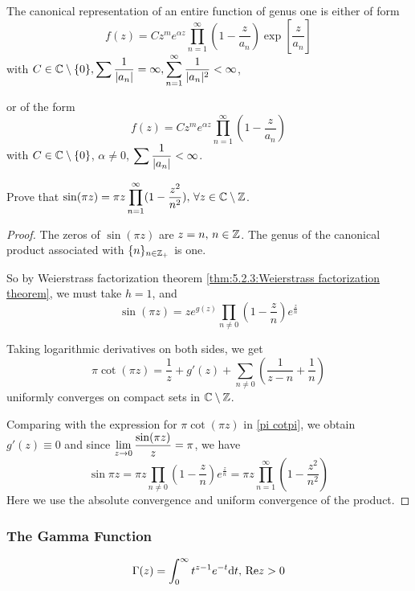 \begin{example}
    The canonical representation of  an entire function of genus one is either of form 
    \begin{equation}
        f(z)=Cz^m e^{\alpha z}\prod_{n=1}^\infty(1-\frac{z}{a_n})\exp\left[\frac{z}{a_n}\right]
    \end{equation}
    with  $ C\in\mathbb C\setminus\{0\},\displaystyle\sum\frac{1}{|a_n|}=\infty,\sum_{n=1}^\infty\frac{1}{|a_n|^2}<\infty $,

    or of the form 
    \begin{equation}
        f(z)=Cz^m e^{\alpha z}\prod_{n=1}^\infty(1-\frac{z}{a_n})
    \end{equation}
    with  $ C\in\mathbb C\setminus\{0\} $, $ \alpha\neq 0 $,  $ \displaystyle\sum\frac{1}{|a_n|}<\infty $.   
\end{example}
\begin{example}
    Prove that  $ \sin(\pi z)=\pi z\displaystyle\prod_{n=1}^\infty(1-\frac{z^2}{n^2}),\,\forall z\in \mathbb C\setminus\mathbb Z $.\label{product expression of sin pi z}
\end{example}
\begin{proof}
    The zeros of  $ \sin(\pi z) $ are  $ z=n,\,n\in \mathbb Z $. The genus of the canonical product associated with  $ \{n\}_{n\in\mathbb Z_+} $ is one.
    
    So by Weierstrass factorization theorem \ref{thm:5.2.3:Weierstrass factorization theorem}, we must take  $ h=1 $, and 
    \begin{equation}
        \sin(\pi z)=z e^{g(z)}\prod_{n\neq 0}(1-\frac{z}{n})e^{\frac{z}{n}}
    \end{equation} 

    Taking logarithmic derivatives on both sides, we get 
    \begin{equation}
        \pi \cot(\pi z)=\frac{1}{z}+g'(z)+\sum_{n\neq 0}\left(\frac{1}{z-n}+\frac{1}{n}\right)
    \end{equation}
    uniformly converges on compact sets in  $ \mathbb C\setminus\mathbb Z $.
    
    Comparing with the expression for  $ \pi \cot(\pi z) $ in \eqref{pi cotpi}, we obtain  $ g'(z)\equiv 0 $ and since
    $ \displaystyle\lim_{z\to0} \frac{\sin(\pi z)}{z}=\pi $, we have 
    \begin{equation*}
        \sin \pi z=\pi z\prod_{n\neq 0}(1-\frac{z}{n})e^{\frac{z}{n}}=\pi z\prod_{n=1}^\infty (1-\frac{z^2}{n^2})
    \end{equation*}
    Here we use the absolute convergence and uniform convergence of the product.
\end{proof}

\subsubsection{The Gamma Function}
\begin{equation}
    \name{$ \Gamma(z) $}=\int_0^\infty t^{z-1}e^{-t}\dd t,\,\Re z>0
\end{equation}